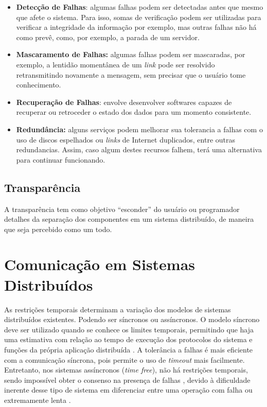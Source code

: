 \documentclass[
	12pt,				%
	oneside,			%
	a4paper,			%
	english,			%
	brazil				%
	]{abntex2ppgsi}
\begin{document}
\begin{itemize}
	\item{\textbf{Detecção de Falhas}: algumas falhas podem ser detectadas antes que mesmo que afete o sistema. Para isso, somas de verificação podem ser utilizadas para verificar a integridade da informação por exemplo, mas outras falhas não há como prevê, como, por exemplo, a parada de um servidor.} 	
	\item{\textbf{Mascaramento de Falhas: } algumas falhas podem ser mascaradas, por exemplo, a lentidão momentânea de um \textit{link} pode ser resolvido retransmitindo novamente a mensagem, sem precisar que o usuário tome conhecimento.}
	\item{\textbf{Recuperação de Falhas}: envolve desenvolver softwares capazes de recuperar ou retroceder o estado dos dados para um momento consistente.}
	\item{\textbf{Redundância:} alguns serviços podem melhorar sua tolerancia a falhas com o uso de discos espelhados ou \textit{links} de Internet duplicados, entre outras redundancias. Assim, caso algum destes recursos falhem, terá uma alternativa para continuar funcionando.}
\end{itemize} 

\subsection{Transparência}

A transparência tem como objetivo ``esconder'' do usuário ou programador detalhes da separação dos componentes em um sistema distribuído, de maneira que seja percebido como um todo.


\section{Comunicação em Sistemas Distribuídos}

As restrições temporais determinam a variação dos modelos de sistemas distribuídos existentes. Podendo ser síncronos ou assíncronos. O modelo síncrono deve ser utilizado quando se conhece os limites temporais, permitindo que haja uma estimativa com relação ao tempo de execução dos protocolos do sistema e funções  da própria aplicação distribuída \cite{lamport1982byzantine} \cite{lynch1996distributed} \cite{cristian1991reaching}. A tolerância a falhas é mais eficiente com a comunicação síncrona, pois permite o uso de \textit{timeout} mais facilmente. Entretanto, nos sistemas assíncronos (\textit{time free}), não há restrições temporais, sendo impossível obter o consenso  na presença de falhas \cite{fischer1985impossibility} \cite{de2000failure}, devido à dificuldade inerente desse tipo de sistema em diferenciar entre uma operação com falha ou extremamente lenta \cite{gorender2002modelo}.
\end{document}
